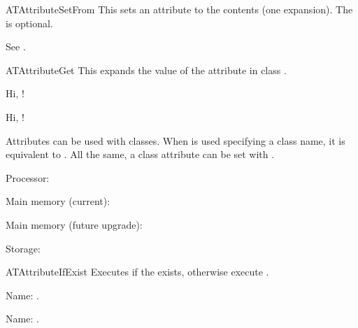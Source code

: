 \documentclass[a4paper, 11pt]{article}
\begin{document}
\begin{Macrodef}{ATAttributeSetFrom}{}{}
    This sets an attribute  to the contents  (one expansion). The  is optional.

    See .
\end{Macrodef}

\begin{Macrodef}{ATAttributeGet}{}{}
    This expands the value of the attribute  in class .
\end{Macrodef}

\begin{PDExample}
    Hi, !

    Hi, !
\end{PDExample}

Attributes can be used with classes. When  is used specifying a class name, it is equivalent to . All the same, a class attribute can be set with .

\begin{PDExample}
    Processor: \par
    Main memory (current): \par
    Main memory (future upgrade): \par
    Storage: \par
\end{PDExample}

\begin{Macrodef}{ATAttributeIfExist}{}{}
    Executes  if the  exists, otherwise execute .
\end{Macrodef}

\begin{PDExample}
    Name:  .

    Name:  .
\end{PDExample}
\end{document}
